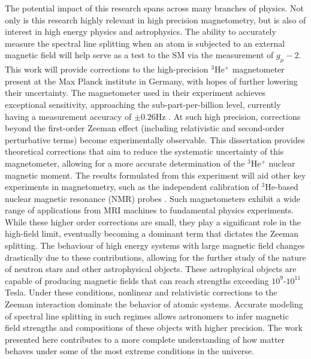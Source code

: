         The potential impact of this research spans across many branches of physics. Not only is this research highly relevant in high precision magnetometry, but is also of interest in high energy physics and astrophysics. The ability to accurately measure the spectral line splitting when an atom is subjected to an external magnetic field will help serve as a test to the SM via the measurement of $g_\mu - 2$. This work will provide corrections to the high-precision $^3$He$^+$ magnetometer present at the Max Planck institute in Germany, with hopes of further lowering their uncertainty. The magnetometer used in their experiment achieves exceptional sensitivity, approaching the sub-part-per-billion level, currently having a measurement accuracy of $\pm 0.26$Hz \cite{Schneider_Sikora_Dickopf_Müller_Oreshkina_Rischka_Valuev_Ulmer_Walz_Harman_et_al._2022}. At such high precision, corrections beyond the first-order Zeeman effect (including relativistic and second-order perturbative terms) become experimentally observable. This dissertation provides theoretical corrections that aim to reduce the systematic uncertainty of this magnetometer, allowing for a more accurate determination of the $^3$He$^+$ nuclear magnetic moment. The results formulated from this experiment will aid other key experiments in magnetometry, such as the independent calibration of $^3$He-based nuclear magnetic resonance (NMR) probes \cite{Farooq_Chupp_Grange_Tewsley-Booth_Flay_Kawall_Sachdeva_Winter_2020}. Such magnetometers exhibit a wide range of applications from MRI machines to fundamental physics experiments. While these higher order corrections are small, they play a significant role in the high-field limit, eventually becoming a dominant term that dictates the Zeeman splitting. The behaviour of high energy systems with large magnetic field changes drastically due to these contributions, allowing for the further study of the nature of neutron stars and other astrophysical objects. These astrophyical objects are capable of producing magnetic fields that can reach strengths exceeding $10^9$-$10^{11}$ Tesla. Under these conditions, nonlinear and relativistic corrections to the Zeeman interaction dominate the behavior of atomic systems. Accurate modeling of spectral line splitting in such regimes allows astronomers to infer magnetic field strengths and compositions of these objects with higher precision. The work presented here contributes to a more complete understanding of how matter behaves under some of the most extreme conditions in the universe.
